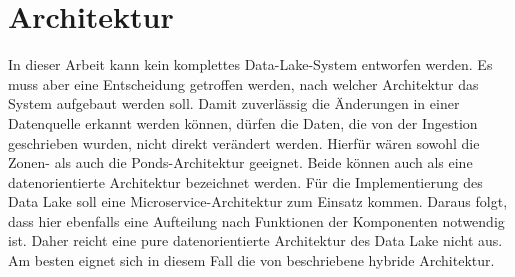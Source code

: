 \section{Architektur}
In dieser Arbeit kann kein komplettes Data-Lake-System entworfen werden.
Es muss aber eine Entscheidung getroffen werden, nach welcher Architektur das System aufgebaut werden soll.
Damit zuverlässig die Änderungen in einer Datenquelle erkannt werden können, dürfen die Daten, die von der Ingestion geschrieben wurden, nicht direkt verändert werden.
Hierfür wären sowohl die Zonen- als auch die Ponds-Architektur geeignet.
Beide können auch als eine datenorientierte Architektur bezeichnet werden.
Für die Implementierung des Data Lake soll eine Microservice-Architektur zum Einsatz kommen.
Daraus folgt, dass hier ebenfalls eine Aufteilung nach Funktionen der Komponenten notwendig ist.
Daher reicht eine pure datenorientierte Architektur des Data Lake nicht aus.
Am besten eignet sich in diesem Fall die von \textcite{sawadogo2021data} beschriebene hybride Architektur.

